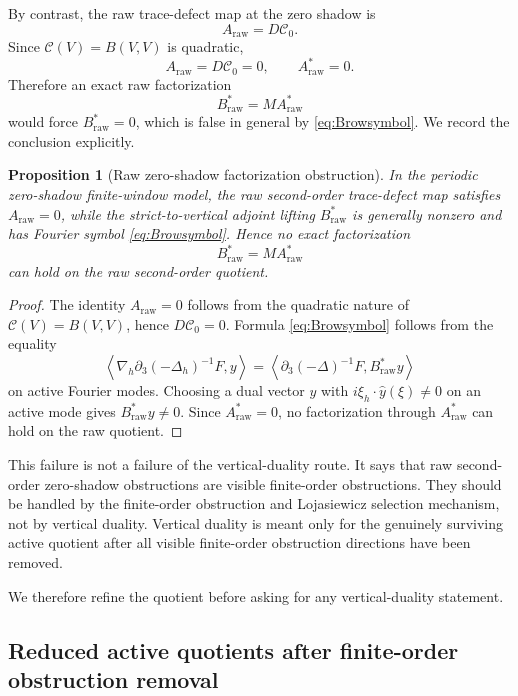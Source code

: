 \documentclass[11pt]{article}
\numberwithin{equation}{section}
\newtheorem{proposition}[theorem]{Proposition}
\newcommand{\ip}[2]{\left\langle #1,#2\right\rangle}
\newcommand{\calC}{\mathcal C}
\begin{document}
By contrast, the raw trace-defect map at the zero shadow is
\[
A_{\mathrm{raw}}=D\calC_0.
\]
Since \(\calC(V)=B(V,V)\) is quadratic,
\begin{equation}\label{eq:Araw-zero}
A_{\mathrm{raw}}=D\calC_0=0,
\qquad
A_{\mathrm{raw}}^*=0.
\end{equation}
Therefore an exact raw factorization
\[
B_{\mathrm{raw}}^*=M A_{\mathrm{raw}}^*
\]
would force \(B_{\mathrm{raw}}^*=0\), which is false in general by \eqref{eq:Browsymbol}.  We record the conclusion explicitly.

\begin{proposition}[Raw zero-shadow factorization obstruction]\label{prop:raw-zero-factorization-obstruction}
In the periodic zero-shadow finite-window model, the raw second-order trace-defect map satisfies \(A_{\mathrm{raw}}=0\), while the strict-to-vertical adjoint lifting \(B_{\mathrm{raw}}^*\) is generally nonzero and has Fourier symbol \eqref{eq:Browsymbol}.  Hence no exact factorization
\[
B_{\mathrm{raw}}^*=M A_{\mathrm{raw}}^*
\]
can hold on the raw second-order quotient.
\end{proposition}

\begin{proof}
The identity \(A_{\mathrm{raw}}=0\) follows from the quadratic nature of \(\calC(V)=B(V,V)\), hence \(D\calC_0=0\).  Formula \eqref{eq:Browsymbol} follows from the equality
\[
\ip{\nabla_h\partial_3(-\Delta_h)^{-1}F}{y}
=
\ip{\partial_3(-\Delta)^{-1}F}{B_{\mathrm{raw}}^*y}
\]
on active Fourier modes.  Choosing a dual vector \(y\) with \(i\xi_h\cdot\widehat y(\xi)\ne0\) on an active mode gives \(B_{\mathrm{raw}}^*y\ne0\).  Since \(A_{\mathrm{raw}}^*=0\), no factorization through \(A_{\mathrm{raw}}^*\) can hold on the raw quotient.
\end{proof}

This failure is not a failure of the vertical-duality route.  It says that raw second-order zero-shadow obstructions are visible finite-order obstructions.  They should be handled by the finite-order obstruction and Lojasiewicz selection mechanism, not by vertical duality.  Vertical duality is meant only for the genuinely surviving active quotient after all visible finite-order obstruction directions have been removed.


We therefore refine the quotient before asking for any vertical-duality statement.

\subsection{Reduced active quotients after finite-order obstruction removal}\label{subsec:reduced-active-quotient}
\end{document}
